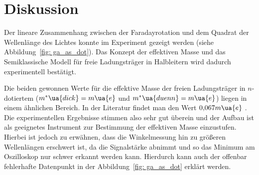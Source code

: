 \section{Diskussion}
Der lineare Zusammenhang zwischen der Faradayrotation und dem Quadrat der Wellenlänge des 
Lichtes konnte im Experiment gezeigt werden (siehe Abbildung~\ref{fig: ga_as_dot}). Das Konzept der effektiven 
Masse und das Semiklassische Modell für freie Ladungsträger in Halbleitern wird dadurch experimentell 
bestätigt.

Die beiden gewonnen Werte für die effektive Masse der freien Ladungsträger in $n$-dotiertem 
 ($m^*\ua{dick} = m\ua{e}$
und $m^*\ua{duenn} = m\ua{e}$)
liegen in einem ähnlichen Bereich. 
In der Literatur findet man den Wert $\num{0.067}m\ua{e}$ \cite{semiconductors}. Die experimentellen 
Ergebnisse stimmen 
also sehr gut überein und der Aufbau ist als geeignetes Instrument zur Bestimmung der effektiven Masse einzustufen.
Hierbei ist jedoch zu erwähnen, dass die Winkelmessung hin zu größeren Wellenlängen erschwert ist, da die 
Signalstärke abnimmt und so das Minimum am Oszilloskop nur schwer erkannt werden kann. Hierdurch kann auch 
der offenbar fehlerhafte Datenpunkt in der Abbildung~\ref{fig: ga_as_dot} erklärt werden. 